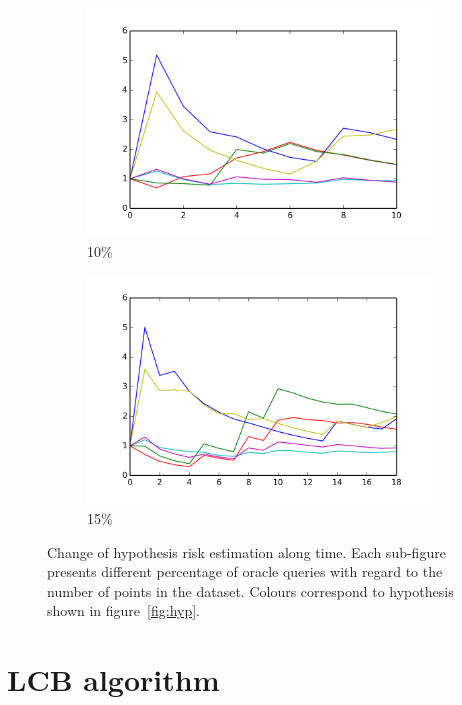\documentclass[12pt, a4paper, pdflatex, leqno]{report}
\begin{document}
\begin{figure}[htbp]
    \begin{subfigure}{.5\linewidth}\centering
    \includegraphics[width=1.1\textwidth]{graphics/convergence10.png}
    \caption{10\%\label{fig:conv.ALL:10}}
  \end{subfigure}
  \begin{subfigure}{.5\linewidth}\centering
    \includegraphics[width=1.1\textwidth]{graphics/convergence15.png}
    \caption{15\%\label{fig:conv.ALL:15}}
  \end{subfigure}

  \caption{Change of hypothesis risk estimation along time. Each sub-figure presents different percentage of oracle queries with regard to the number of points in the dataset. Colours correspond to hypothesis shown in figure~\ref{fig:hyp}.\label{fig:conv.ALL}}
\end{figure}


\section{LCB algorithm}
\end{document}
